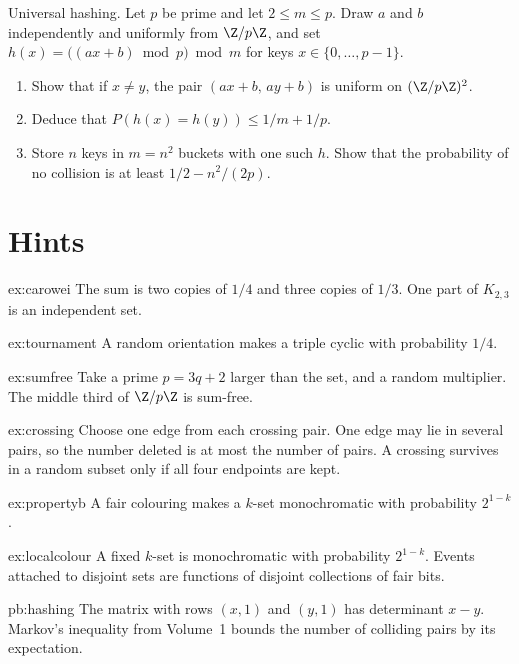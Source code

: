 \begin{exercise}[$\star$]\label{pb:hashing}
Universal hashing. Let $p$ be prime and let $2\le m\le p$. Draw $a$ and $b$ independently and uniformly from $\Z/p\Z$, and set $h(x)=\bigl((ax+b)\bmod p\bigr)\bmod m$ for keys $x\in\{0,\ldots,p-1\}$.
\begin{enumerate}[label=(\alph*)]
\item Show that if $x\ne y$, the pair $(ax+b,\,ay+b)$ is uniform on $(\Z/p\Z)^2$.
\item Deduce that $P(h(x)=h(y))\le 1/m+1/p$.
\item Store $n$ keys in $m=n^2$ buckets with one such $h$. Show that the probability of no collision is at least $1/2-n^2/(2p)$.
\end{enumerate}
\end{exercise}

\section{Hints}

\begin{hint}{ex:carowei}
The sum is two copies of $1/4$ and three copies of $1/3$. One part of $K_{2,3}$ is an independent set.
\end{hint}
\begin{hint}{ex:tournament}
A random orientation makes a triple cyclic with probability $1/4$.
\end{hint}
\begin{hint}{ex:sumfree}
Take a prime $p=3q+2$ larger than the set, and a random multiplier. The middle third of $\Z/p\Z$ is sum-free.
\end{hint}
\begin{hint}{ex:crossing}
Choose one edge from each crossing pair. One edge may lie in several pairs, so the number deleted is at most the number of pairs. A crossing survives in a random subset only if all four endpoints are kept.
\end{hint}
\begin{hint}{ex:propertyb}
A fair colouring makes a $k$-set monochromatic with probability $2^{1-k}$.
\end{hint}
\begin{hint}{ex:localcolour}
A fixed $k$-set is monochromatic with probability $2^{1-k}$. Events attached to disjoint sets are functions of disjoint collections of fair bits.
\end{hint}


\begin{hint}{pb:hashing}
The matrix with rows $(x,1)$ and $(y,1)$ has determinant $x-y$. Markov's inequality from Volume~1 bounds the number of colliding pairs by its expectation.
\end{hint}

